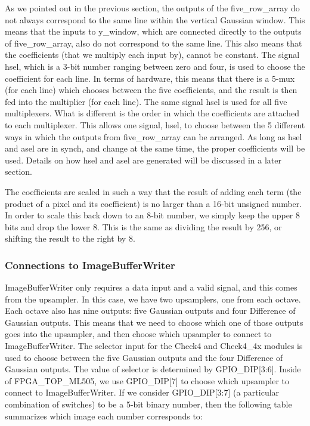 \documentclass[12pt]{article}
\begin{document}
As we pointed out in the previous section, the outputs of the five\_row\_array do 
not always correspond to the same line within the vertical Gaussian window. This 
means that the inputs to y\_window, which are connected directly to the outputs 
of five\_row\_array, also do not correspond to the same line. This also means that 
the coefficients (that we multiply each input by), cannot be constant. The 
signal hsel, which is a 3-bit number ranging between zero and four, is used to 
choose the coefficient for each line. In terms of hardware, this means that 
there is a 5-mux (for each line) which chooses between the five coefficients, 
and the result is then fed into the multiplier (for each line). The same signal 
hsel is used for all five multiplexers. What is different is the order in which 
the coefficients are attached to each multiplexer. This allows one signal, hsel, 
to choose between the 5 different ways in which the outputs from five\_row\_array 
can be arranged. As long as hsel and asel are in synch, and change at the same 
time, the proper coefficients will be used. Details on how hsel and asel are 
generated will be discussed in a later section.

The coefficients are scaled in such a way that the result of adding each term 
(the product of a pixel and its coefficient) is no larger than a 16-bit unsigned 
number. In order to scale this back down to an 8-bit number, we simply keep the 
upper 8 bits and drop the lower 8. This is the same as dividing the result by 
256, or shifting the result to the right by 8.


\subsubsection{Connections to ImageBufferWriter}

ImageBufferWriter only requires a data input and a valid signal, and this comes 
from the upsampler. In this case, we have two upsamplers, one from each octave. 
Each octave also has nine outputs: five Gaussian outputs and four Difference of 
Gaussian outputs. This means that we need to choose which one of those outputs 
goes into the upsampler, and then choose which upsampler to connect to 
ImageBufferWriter. The selector input for the Check4 and Check4\_4x modules is 
used to choose between the five Gaussian outputs and the four Difference of 
Gaussian outputs. The value of selector is determined by GPIO\_DIP[3:6]. Inside 
of FPGA\_TOP\_ML505, we use GPIO\_DIP[7] to choose which upsampler to connect to 
ImageBufferWriter. If we consider GPIO\_DIP[3:7] (a particular combination of 
switches) to be a 5-bit binary number, then the following table summarizes which 
image each number corresponds to:
\end{document}
